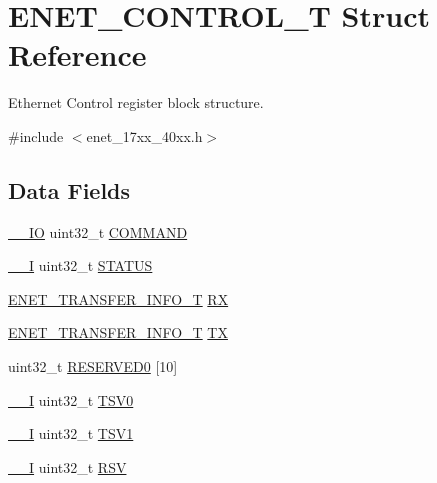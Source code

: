 \hypertarget{structENET__CONTROL__T}{\section{E\-N\-E\-T\-\_\-\-C\-O\-N\-T\-R\-O\-L\-\_\-\-T Struct Reference}
\label{structENET__CONTROL__T}
}


Ethernet Control register block structure.  




{\ttfamily \#include $<$enet\-\_\-17xx\-\_\-40xx.\-h$>$}

\subsection*{Data Fields}
\begin{DoxyCompactItemize}
\item 
\hyperlink{core__cm3_8h_aec43007d9998a0a0e01faede4133d6be}{\-\_\-\-\_\-\-I\-O} uint32\-\_\-t \hyperlink{structENET__CONTROL__T_a5c6633c6ca37621d5f23513ebca2bd17}{C\-O\-M\-M\-A\-N\-D}
\item 
\hyperlink{core__cm3_8h_af63697ed9952cc71e1225efe205f6cd3}{\-\_\-\-\_\-\-I} uint32\-\_\-t \hyperlink{structENET__CONTROL__T_aaaef8a4b3d2a27e488d5e2e8a236640a}{S\-T\-A\-T\-U\-S}
\item 
\hyperlink{structENET__TRANSFER__INFO__T}{E\-N\-E\-T\-\_\-\-T\-R\-A\-N\-S\-F\-E\-R\-\_\-\-I\-N\-F\-O\-\_\-\-T} \hyperlink{structENET__CONTROL__T_a3b07c9a812059f852415f8b5a5261882}{R\-X}
\item 
\hyperlink{structENET__TRANSFER__INFO__T}{E\-N\-E\-T\-\_\-\-T\-R\-A\-N\-S\-F\-E\-R\-\_\-\-I\-N\-F\-O\-\_\-\-T} \hyperlink{structENET__CONTROL__T_a1010eaf24cd6af0d6355b4cd34d8e90a}{T\-X}
\item 
uint32\-\_\-t \hyperlink{structENET__CONTROL__T_a662f1911bc2db756493ef2dd77e83be5}{R\-E\-S\-E\-R\-V\-E\-D0} \mbox{[}10\mbox{]}
\item 
\hyperlink{core__cm3_8h_af63697ed9952cc71e1225efe205f6cd3}{\-\_\-\-\_\-\-I} uint32\-\_\-t \hyperlink{structENET__CONTROL__T_adfd0bf0a173cb107271eba4fa8f20de8}{T\-S\-V0}
\item 
\hyperlink{core__cm3_8h_af63697ed9952cc71e1225efe205f6cd3}{\-\_\-\-\_\-\-I} uint32\-\_\-t \hyperlink{structENET__CONTROL__T_a03b03ad79457f3f25cc3d1d2d564310a}{T\-S\-V1}
\item 
\hyperlink{core__cm3_8h_af63697ed9952cc71e1225efe205f6cd3}{\-\_\-\-\_\-\-I} uint32\-\_\-t \hyperlink{structENET__CONTROL__T_a5817f844b6195193d1536edbc770e72f}{R\-S\-V}

\end{DoxyCompactItemize}
